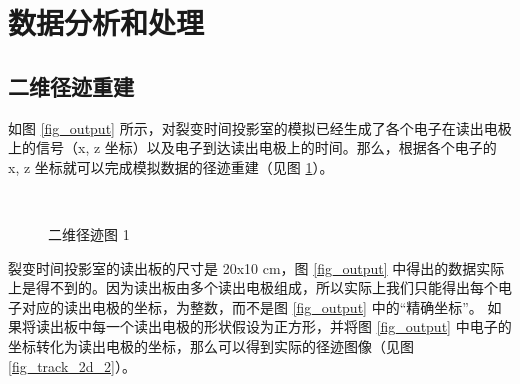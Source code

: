 \documentclass[AutoFakeBold]{LZUThesis}
\begin{document}
\section{数据分析和处理}
\subsection{二维径迹重建}
\label{sub:二维径迹重建}
如图 \ref{fig_output} 所示，对裂变时间投影室的模拟已经生成了各个电子在读出电极上的信号（x, z 坐标）以及电子到达读出电极上的时间。那么，根据各个电子的 x, z 坐标就可以完成模拟数据的径迹重建（见图 \ref{fig_track_2d_1}）。

\begin{figure}[H]
	\centering
	\\	
    \caption{二维径迹图 1}
    \label{fig_track_2d_1}
\end{figure}

裂变时间投影室的读出板的尺寸是 20x10 cm，图 \ref{fig_output} 中得出的数据实际上是得不到的。因为读出板由多个读出电极组成，所以实际上我们只能得出每个电子对应的读出电极的坐标，为整数，而不是图 \ref{fig_output} 中的“精确坐标”。
如果将读出板中每一个读出电极的形状假设为正方形，并将图 \ref{fig_output} 中电子的坐标转化为读出电极的坐标，那么可以得到实际的径迹图像（见图 \ref{fig_track_2d_2}）。
\end{document}
